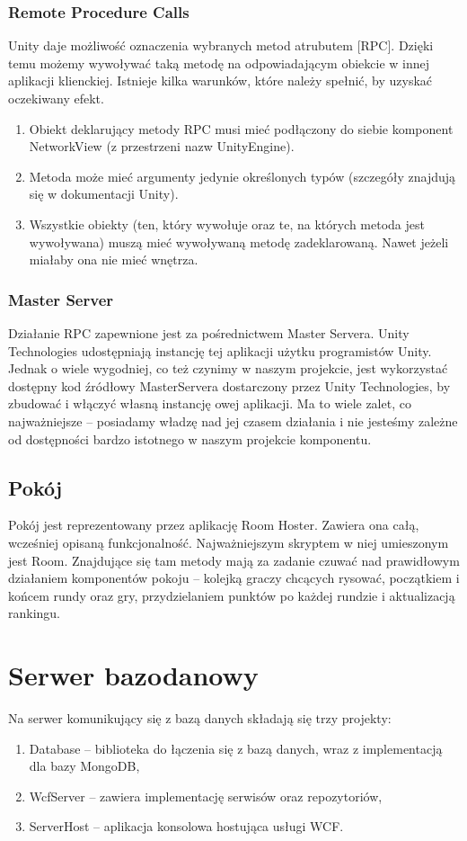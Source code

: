 \subsubsection{Remote Procedure Calls}
Unity daje możliwość oznaczenia wybranych metod atrubutem [RPC]. Dzięki temu możemy wywoływać taką metodę na odpowiadającym obiekcie w innej aplikacji klienckiej. Istnieje kilka warunków, które należy spełnić, by uzyskać oczekiwany efekt.
\begin{enumerate}
    \item Obiekt deklarujący metody RPC musi mieć podłączony do siebie komponent NetworkView (z przestrzeni nazw UnityEngine).
    \item Metoda może mieć argumenty jedynie określonych typów (szczegóły znajdują się w dokumentacji Unity).
    \item Wszystkie obiekty (ten, który wywołuje oraz te, na których metoda jest wywoływana) muszą mieć wywoływaną metodę zadeklarowaną. Nawet jeżeli miałaby ona nie mieć wnętrza.
\end{enumerate}

\subsubsection{Master Server}
Działanie RPC zapewnione jest za pośrednictwem Master Servera. Unity Technologies udostępniają instancję tej aplikacji użytku programistów Unity. Jednak o wiele wygodniej, co też czynimy w naszym projekcie, jest wykorzystać dostępny kod źródłowy MasterServera dostarczony przez Unity Technologies, by zbudować i włączyć własną instancję owej aplikacji. Ma to wiele zalet, co najważniejsze – posiadamy władzę nad jej czasem działania i nie jesteśmy zależne od dostępności bardzo istotnego w naszym projekcie komponentu.

\subsection{Pokój}
Pokój jest reprezentowany przez aplikację Room Hoster. Zawiera ona całą, wcześniej opisaną funkcjonalność. Najważniejszym skryptem w niej umieszonym jest Room. Znajdujące się tam metody mają za zadanie czuwać nad prawidłowym działaniem komponentów pokoju – kolejką graczy chcących rysować, początkiem i końcem rundy oraz gry, przydzielaniem punktów po każdej rundzie i aktualizacją rankingu.

\section{Serwer bazodanowy}
Na serwer komunikujący się z bazą danych składają się trzy projekty:
\begin{enumerate}
    \item Database – biblioteka do łączenia się z bazą danych, wraz z implementacją dla bazy MongoDB,
    \item WcfServer – zawiera implementację serwisów oraz repozytoriów,
    \item ServerHost – aplikacja konsolowa hostująca usługi WCF.
\end{enumerate}

